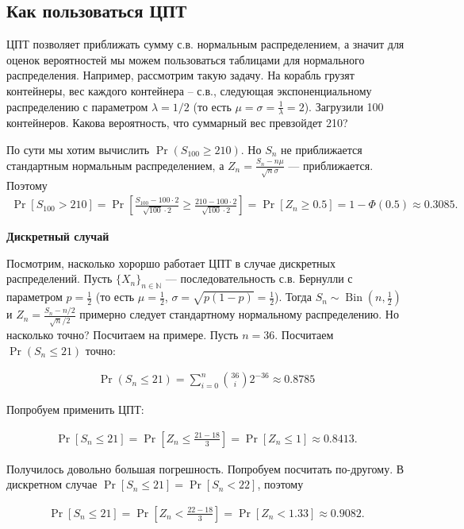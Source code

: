 \documentclass[12pt]{article}
\newcommand\N{\mathbb{N}}
\DeclareMathOperator{\Bin}{Bin}
\begin{document}
\subsection{Как пользоваться ЦПТ}

ЦПТ позволяет приближать сумму с.в. нормальным распределением, а значит для оценок вероятностей мы можем пользоваться таблицами для нормального распределения. Например, рассмотрим такую задачу. На корабль грузят контейнеры, вес каждого контейнера -- с.в., следующая экспоненциальному распределению с параметром $\lambda = 1/2$ (то есть $\mu = \sigma = \frac{1}{\lambda} = 2$).  Загрузили 100 контейнеров. Какова вероятность, что суммарный вес превзойдет 210?

По сути мы хотим вычислить $\Pr(S_{100} \ge 210)$. Но $S_n$ не приближается стандартным нормальным распределением, а $Z_n = \frac{S_n - n\mu}{\sqrt{n}\sigma}$ --- приближается. Поэтому
\begin{align*}
  \Pr[S_{100} > 210] = \Pr\left[\frac{S_{100} - 100 \cdot 2}{\sqrt{100} \cdot 2} \ge \frac{210 - 100 \cdot 2}{\sqrt{100} \cdot 2}\right] = \Pr[Z_n \ge 0.5] = 1 - \Phi(0.5) \approx 0.3085.
\end{align*}

\textbf{Дискретный случай}

Посмотрим, насколько хороршо работает ЦПТ в случае дискретных распределений. Пусть $\{X_n\}_{n \in \N}$ --- последовательность с.в. Бернулли с параметром $p = \frac{1}{2}$ (то есть $\mu = \frac{1}{2}$, $\sigma = \sqrt{p(1 - p)} = \frac{1}{2}$). Тогда $S_n \sim \Bin(n, \frac{1}{2})$ и $Z_n = \frac{S_n - n/2}{\sqrt{n}/2}$ примерно следует стандартному нормальному распределению. Но насколько точно? Посчитаем на примере. Пусть $n = 36$. Посчитаем $\Pr(S_n \le 21)$ точно:

\begin{align*}
  \Pr(S_n \le 21) = \sum_{i = 0}^n \binom{36}{i} 2^{-36} \approx 0.8785
\end{align*}

Попробуем применить ЦПТ:

\begin{align*}
  \Pr[S_n \le 21] = \Pr\left[Z_n \le \frac{21 - 18}{3}\right] = \Pr[Z_n \le 1] \approx 0.8413.
\end{align*}

Получилось довольно большая погрешность. Попробуем посчитать по-другому. В дискретном случае $\Pr[S_n \le 21] = \Pr[S_n < 22]$, поэтому

\begin{align*}
  \Pr[S_n \le 21] = \Pr\left[Z_n < \frac{22 - 18}{3}\right] = \Pr[Z_n < 1.33] \approx 0.9082.
\end{align*}
\end{document}
